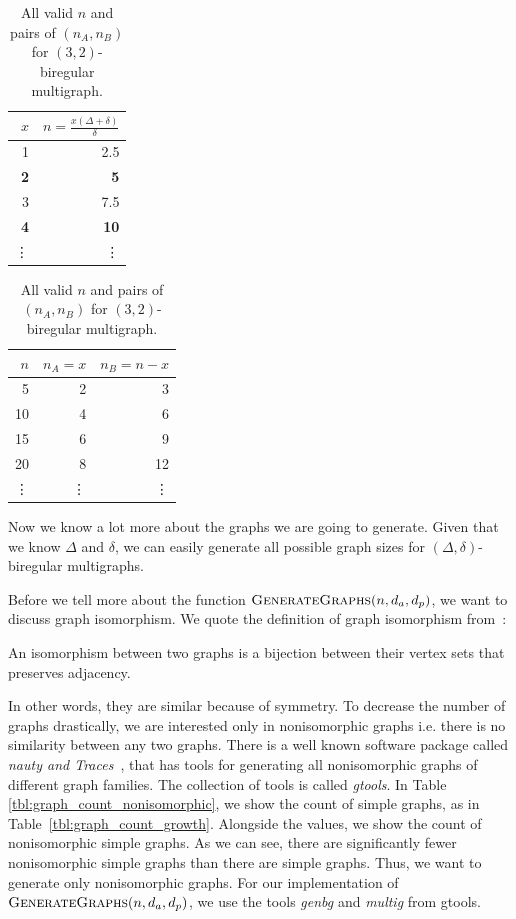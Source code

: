 \begin{table}[H]
  \parbox{.45\linewidth}{
  \centering
  \begin{tabular}{rr}
    \toprule
    $x$&$n=\frac{x(\Delta + \delta)}{\delta}$\\
    \midrule
    1 & 2.5 \\
    \textbf{2} & \textbf{5}   \\
    3 & 7.5 \\
    \textbf{4} & \textbf{10}  \\
    \vdots & \vdots \\
    \bottomrule
  \end{tabular}
  \caption{
    All values of $x$ and $n$ for $(3,2)$-biregular multigraph.
    All rows where $n$ is an integer, are bolded.
  }
  \label{tbl:values_of_x}
  }
  \hfill
  \parbox{.45\linewidth}{
  \centering
  \begin{tabular}{rrr}
    \toprule
    $n$&$n_A=x$&$n_B=n-x$\\
    \midrule
    5 & 2 & 3   \\
    10 & 4 & 6  \\
    15 & 6 & 9  \\
    20 & 8 & 12 \\
    \vdots & \vdots & \vdots\\
    \bottomrule
  \end{tabular}
  \caption{
    All valid $n$ and pairs of $(n_A, n_B)$ for $(3,2)$-biregular multigraph.
  }
  \label{tbl:valid_pairs}
  }
\end{table}

Now we know a lot more about the graphs we are going to generate.
Given that we know $\Delta$ and $\delta$, we can easily generate all possible graph sizes for $(\Delta, \delta)$-biregular multigraphs.

Before we tell more about the function $\textsc{GenerateGraphs}(n, d_a, d_p)$, we want to discuss graph isomorphism.
We quote the definition of graph isomorphism from~\cite{DBLP:journals/jsc/McKayP14}:
\begin{displayquote}
An isomorphism between two graphs is a bijection between their vertex sets that preserves adjacency.
\end{displayquote}
In other words, they are similar because of symmetry.
To decrease the number of graphs drastically, we are interested only in nonisomorphic graphs i.e. there is no similarity between any two graphs.
There is a well known software package called \emph{nauty and Traces}~\cite{DBLP:journals/jsc/McKayP14}, that has tools for generating all nonisomorphic graphs of different graph families.
The collection of tools is called \emph{gtools}.
In Table \ref{tbl:graph_count_nonisomorphic}, we show the count of simple graphs, as in Table~\ref{tbl:graph_count_growth}.
Alongside the values, we show the count of nonisomorphic simple graphs.
As we can see, there are significantly fewer nonisomorphic simple graphs than there are simple graphs.
Thus, we want to generate only nonisomorphic graphs.
For our implementation of $\textsc{GenerateGraphs}(n, d_a, d_p)$, we use the tools \emph{genbg} and \emph{multig} from gtools.

